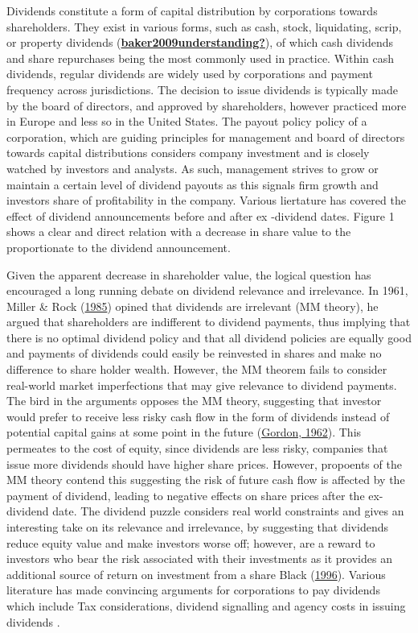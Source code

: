 \documentclass[11pt,preprint, authoryear]{elsarticle}
\numberwithin{equation}{section}
\numberwithin{figure}{section}
\numberwithin{table}{section}
\begin{document}
Dividends constitute a form of capital distribution by corporations
towards shareholders. They exist in various forms, such as cash, stock,
liquidating, scrip, or property dividends
(\protect\hyperlink{ref-baker2009understanding}{\textbf{baker2009understanding?}}),
of which cash dividends and share repurchases being the most commonly
used in practice. Within cash dividends, regular dividends are widely
used by corporations and payment frequency across jurisdictions. The
decision to issue dividends is typically made by the board of directors,
and approved by shareholders, however practiced more in Europe and less
so in the United States. The payout policy policy of a corporation,
which are guiding principles for management and board of directors
towards capital distributions considers company investment and is
closely watched by investors and analysts. As such, management strives
to grow or maintain a certain level of dividend payouts as this signals
firm growth and investors share of profitability in the company. Various
liertature has covered the effect of dividend announcements before and
after ex -dividend dates. Figure 1 shows a clear and direct relation
with a decrease in share value to the proportionate to the dividend
announcement.

Given the apparent decrease in shareholder value, the logical question
has encouraged a long running debate on dividend relevance and
irrelevance. In 1961, Miller \& Rock
(\protect\hyperlink{ref-miller1985dividend}{1985}) opined that dividends
are irrelevant (MM theory), he argued that shareholders are indifferent
to dividend payments, thus implying that there is no optimal dividend
policy and that all dividend policies are equally good and payments of
dividends could easily be reinvested in shares and make no difference to
share holder wealth. However, the MM theorem fails to consider
real-world market imperfections that may give relevance to dividend
payments. The bird in the arguments opposes the MM theory, suggesting
that investor would prefer to receive less risky cash flow in the form
of dividends instead of potential capital gains at some point in the
future (\protect\hyperlink{ref-gordon1962}{Gordon, 1962}). This
permeates to the cost of equity, since dividends are less risky,
companies that issue more dividends should have higher share prices.
However, propoents of the MM theory contend this suggesting the risk of
future cash flow is affected by the payment of dividend, leading to
negative effects on share prices after the ex-dividend date. The
dividend puzzle considers real world constraints and gives an
interesting take on its relevance and irrelevance, by suggesting that
dividends reduce equity value and make investors worse off; however, are
a reward to investors who bear the risk associated with their
investments as it provides an additional source of return on investment
from a share Black (\protect\hyperlink{ref-black1996dividend}{1996}).
Various literature has made convincing arguments for corporations to pay
dividends which include Tax considerations, dividend signalling and
agency costs in issuing dividends .
\end{document}
